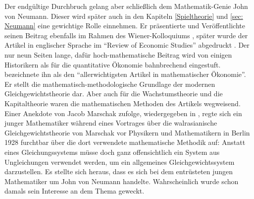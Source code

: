 Der endgültige Durchbruch gelang aber schließlich dem Mathematik-Genie John von Neumann. Dieser wird später auch in den Kapiteln \ref{Spieltheorie} und \ref{sec: Neumann} eine gewichtige Rolle einnehmen. Er präsentierte und Veröffentlichte seinen Beitrag ebenfalls im Rahmen des Wiener-Kolloquiums \parencite{Neumann1937}, später wurde der Artikel in englischer Sprache im "`Review of Economic Studies"' abgedruckt \parencite{Neumann1945}. Der nur neun Seiten lange, dafür hoch-mathematische Beitrag wird von einigen Historikern als für die quantitative Ökonomie bahnbrechend eingestuft. \textcite[S. 13]{Weintraub1983} bezeichnete ihn als den "`allerwichtigsten Artikel in mathematischer Ökonomie"'. Er stellt die mathematisch-methodologische Grundlage der modernen Gleichgewichtstheorie dar. Aber auch für die Wachstumstheorie und die Kapitaltheorie waren die mathematischen Methoden des Artikels wegweisend. Einer Anekdote von Jacob Marschak zufolge, wiedergegeben in \textcite[S. 13]{Weintraub1983}, regte sich ein junger Mathematiker während eines Vortrages über die walrasianische Gleichgewichtstheorie von Marschak vor Physikern und Mathematikern in Berlin 1928 furchtbar über die dort verwendete mathematische Methodik auf: Anstatt eines Gleichungssystems müsse doch ganz offensichtlich ein System aus Ungleichungen verwendet werden, um ein allgemeines Gleichgewichtssystem darzustellen. Es stellte sich heraus, dass es sich bei dem entrüsteten jungen Mathematiker um John von Neumann handelte. Wahrscheinlich wurde schon damals sein Interesse an dem Thema geweckt.
